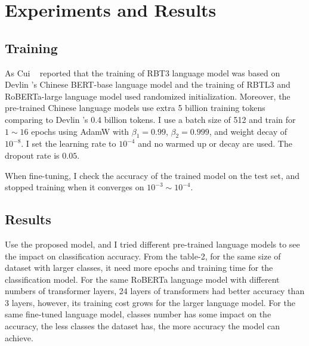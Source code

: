 \documentclass[review]{cvpr}
\begin{document}


\section{Experiments and Results}


\subsection{Training}

As Cui \etal~\cite{cui2019pre} reported that the training of RBT3 language model was based on Devlin \etal's
Chinese BERT-base language model and the training of RBTL3 and RoBERTa-large language model used randomized initialization.
Moreover, the pre-trained Chinese language models use extra 5 billion training tokens comparing to Devlin \etal's 0.4 billion tokens.
I use a batch size of 512 and train for $1\sim16$ epochs using AdamW with $\beta_1=0.99$, $\beta_2=0.999$, and weight decay of $10^{-8}$.
I set the learning rate to $10^{-4}$ and no warmed up or decay are used.
The dropout rate is $0.05$.

\par When fine-tuning, I check the accuracy of the trained model on the test set, and stopped training when it converges on $10^{-3}\sim10^{-4}$.


\subsection{Results}

Use the proposed model, and I tried different pre-trained language models to see the impact on classification accuracy.
From the table-2, for the same size of dataset with larger classes, it need more epochs and training time for the classification model.
For the same RoBERTa language model with different numbers of transformer layers, 24 layers of transformers had better accuracy than 3 layers,
however, its training cost grows for the larger language model.
For the same fine-tuned language model, classes number has some impact on the accuracy,
the less classes the dataset has, the more accuracy the model can achieve.
\end{document}
